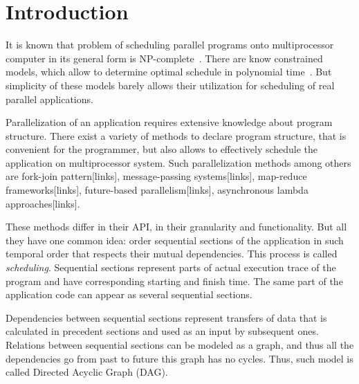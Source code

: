 \chapter{Introduction}
\label{sec:intro}



It is known that problem of scheduling parallel programs onto
multiprocessor computer in its general form is
NP-complete~\cite{Ullman1975}. There are know constrained models,
which allow to determine optimal schedule in polynomial
time~\cite{Hu1961, Coffman1972, Papadimitriou1979}.  But simplicity of
these models barely allows their utilization for scheduling of real
parallel applications.

Parallelization of an application requires extensive knowledge about
program structure. There exist a variety of methods to declare program
structure, that is convenient for the programmer, but also allows to
effectively schedule the application on multiprocessor system. Such
parallelization methods among others are fork-join pattern[links],
message-passing systems[links], map-reduce frameworks[links],
future-based parallelism[links], asynchronous lambda
approaches[links].

These methods differ in their API, in their granularity and
functionality. But all they have one common idea: order sequential
sections of the application in such temporal order that respects their
mutual dependencies. This process is called
\emph{scheduling}. Sequential sections represent parts of actual
execution trace of the program and have corresponding starting and
finish time. The same part of the application code can appear as
several sequential sections.

Dependencies between sequential sections represent transfers of data
that is calculated in precedent sections and used as an input by
subsequent ones. Relations between sequential sections can be modeled
as a graph, and thus all the dependencies go from past to future this
graph has no cycles. Thus, such model is called Directed Acyclic Graph
(DAG).

